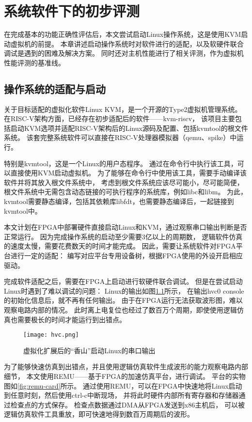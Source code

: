 \chapter{系统软件下的初步评测}

在完成基本的功能正确性评估后，本文尝试启动Linux操作系统，这是使用KVM启动虚拟机的前提。
本章讲述启动操作系统时对软件进行的适配，以及软硬件联合调试是遇到的困难及解决方案。
同时还对主机性能进行了相关评测，作为虚拟机性能评测的基准线。

\section{操作系统的适配与启动}
关于目标适配的虚拟化软件Linux KVM，是一个开源的Type2虚拟机管理系统。
在RISC-V架构方面，已经存在初步适配后的软件——kvm-riscv\cite{github:riscv-kvm}，
该项目主要包括启动KVM选项并适配RISC-V架构后的Linux源码及配置、包括kvmtool的根文件系统。
该套完整系统软件可以直接在RISC-V处理器模拟器（qemu、spike）中运行。

特别是kvmtool，这是一个Linux的用户态程序。
通过在命令行中执行该工具，可以直接使用KVM启动虚拟机。
为了能够在命令行中使用该工具，需要手动编译该软件并将其放入根文件系统中，
考虑到根文件系统应该尽可能小，尽可能简便，
根文件系统中无需包含动态链接的可执行程序的系统库，例如libc和libm。
为此，kvmtool需要静态编译，包括其依赖库libfdt，也需要静态编译后，一起链接到kvmtool中。

本文计划在FPGA中部署硬件直接启动Linux和KVM，通过观察串口输出判断是否正常运行。
因为完成操作系统的启动至少需要3亿以上的周期数，
逻辑软件仿真的速度太慢，需要花费数天的时间才能完成。
因此，需要让系统软件对FPGA平台进行一定的适配：
编写对应平台专用设备树，根据FPGA使用的外设开启相应驱动。

完成软件适配之后，需要在FPGA上启动进行软硬件联合调试。
但是在尝试启动Linux时遇到了难以调试的问题：
Linux的输出如图\ref{fig:console-block}所示，
在输出hvc0 console的初始化信息后，就不再有任何输出。
由于在FPGA运行无法获取波形图，难以观察电路内部的情况。
此时离上电复位也经过了数百万个周期，即使使用逻辑仿真也需要极长的时间才能运行到出错点。

\begin{figure}[htbp]
    \centering
\texttt{[image: hvc.png]}
    \caption{虚拟化扩展后的“香山”启动Linux的串口输出}
    \label{fig:console-block}
\end{figure}

为了能够快速仿真到出错点，并且使用逻辑仿真软件生成波形的能力观察电路内部细节，
本文使用REMU\cite{iccd2023remu}——基于FPGA的加速仿真平台，进行调试。
平台的实物图如\ref{fig:remu-card}所示。
通过使用REMU，可以在FPGA中快速地将Linux启动到任意时刻，然后使用ctrl-c中断现场，
并将此时硬件内部所有寄存器和存储器通过检查点的方式保存。
检查点数据通过DMA从FPGA发送到x86主机后，
可以被逻辑仿真软件工具重放，即可快速地得到数百万周期后的波形。



